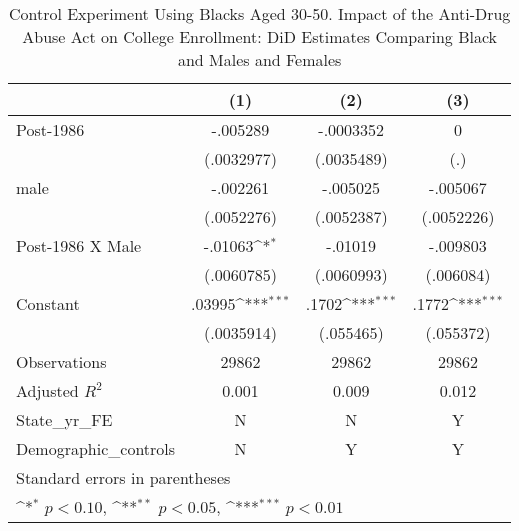 \begin{table}[htbp]\centering
\def\sym#1{\ifmmode^{#1}\else\(^{#1}\)\fi}
\caption{Control Experiment Using Blacks Aged 30-50. Impact of the Anti-Drug Abuse Act on College Enrollment: DiD Estimates Comparing Black and Males and Females}
\begin{tabular}{l*{3}{c}}
\hline\hline
                    &\multicolumn{1}{c}{(1)}         &\multicolumn{1}{c}{(2)}         &\multicolumn{1}{c}{(3)}         \\
\hline
Post-1986           &    -.005289         &   -.0003352         &           0         \\
                    &  (.0032977)         &  (.0035489)         &         (.)         \\
[1em]
male                &    -.002261         &    -.005025         &    -.005067         \\
                    &  (.0052276)         &  (.0052387)         &  (.0052226)         \\
[1em]
Post-1986 X Male    &     -.01063\sym{*}  &     -.01019         &    -.009803         \\
                    &  (.0060785)         &  (.0060993)         &   (.006084)         \\
[1em]
Constant            &      .03995\sym{***}&       .1702\sym{***}&       .1772\sym{***}\\
                    &  (.0035914)         &   (.055465)         &   (.055372)         \\
\hline
Observations        &       29862         &       29862         &       29862         \\
Adjusted \(R^{2}\)  &       0.001         &       0.009         &       0.012         \\
State\_yr\_FE         &           N         &           N         &           Y         \\
Demographic\_controls&           N         &           Y         &           Y         \\
\hline\hline
\multicolumn{4}{l}{\footnotesize Standard errors in parentheses}\\
\multicolumn{4}{l}{\footnotesize \sym{*} \(p<0.10\), \sym{**} \(p<0.05\), \sym{***} \(p<0.01\)}\\
\end{tabular}
\end{table}
